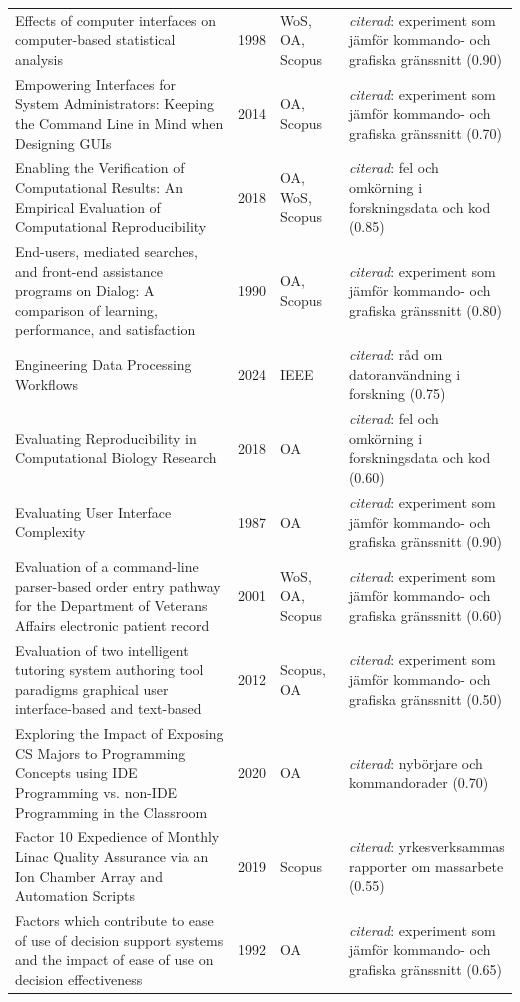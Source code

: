 \begin{longtable}{@{}%
  >{\raggedright\arraybackslash}p{}c%
  >{\raggedright\arraybackslash}p{}%
  >{\raggedright\arraybackslash}p{}@{}}
Effects of computer interfaces on computer-based statistical analysis & 1998 & WoS, OA, Scopus & \emph{citerad}: experiment som jämför kommando- och grafiska gränssnitt (0.90) \\
Empowering Interfaces for System Administrators: Keeping the Command Line in Mind when Designing GUIs & 2014 & OA, Scopus & \emph{citerad}: experiment som jämför kommando- och grafiska gränssnitt (0.70) \\
Enabling the Verification of Computational Results: An Empirical Evaluation of Computational Reproducibility & 2018 & OA, WoS, Scopus & \emph{citerad}: fel och omkörning i forskningsdata och kod (0.85) \\
End-users, mediated searches, and front-end assistance programs on Dialog: A comparison of learning, performance, and satisfaction & 1990 & OA, Scopus & \emph{citerad}: experiment som jämför kommando- och grafiska gränssnitt (0.80) \\
Engineering Data Processing Workflows & 2024 & IEEE & \emph{citerad}: råd om datoranvändning i forskning (0.75) \\
Evaluating Reproducibility in Computational Biology Research & 2018 & OA & \emph{citerad}: fel och omkörning i forskningsdata och kod (0.60) \\
Evaluating User Interface Complexity & 1987 & OA & \emph{citerad}: experiment som jämför kommando- och grafiska gränssnitt (0.90) \\
Evaluation of a command-line parser-based order entry pathway for the Department of Veterans Affairs electronic patient record & 2001 & WoS, OA, Scopus & \emph{citerad}: experiment som jämför kommando- och grafiska gränssnitt (0.60) \\
Evaluation of two intelligent tutoring system authoring tool paradigms graphical user interface-based and text-based & 2012 & Scopus, OA & \emph{citerad}: experiment som jämför kommando- och grafiska gränssnitt (0.50) \\
Exploring the Impact of Exposing CS Majors to Programming Concepts using IDE Programming vs. non-IDE Programming in the Classroom & 2020 & OA & \emph{citerad}: nybörjare och kommandorader (0.70) \\
Factor 10 Expedience of Monthly Linac Quality Assurance via an Ion Chamber Array and Automation Scripts & 2019 & Scopus & \emph{citerad}: yrkesverksammas rapporter om massarbete (0.55) \\
Factors which contribute to ease of use of decision support systems and the impact of ease of use on decision effectiveness & 1992 & OA & \emph{citerad}: experiment som jämför kommando- och grafiska gränssnitt (0.65) \\

\end{longtable}
